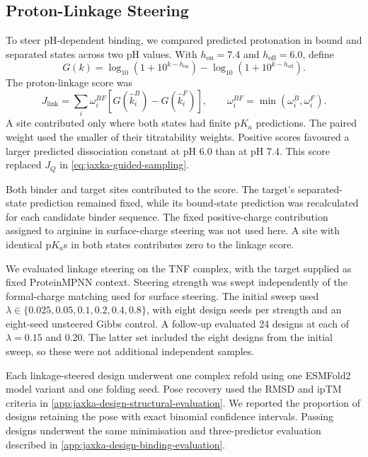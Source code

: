 \subsection{Proton-Linkage Steering}
\label{app:jaxka-proton-linkage}

To steer pH-dependent binding, we compared predicted protonation in bound and separated states across two pH values. With $h_{\mathrm{on}}=7.4$ and $h_{\mathrm{off}}=6.0$, define
\begin{equation}
    G(k)=
    \log_{10}\!\left(1+10^{k-h_{\mathrm{on}}}\right)
    -\log_{10}\!\left(1+10^{k-h_{\mathrm{off}}}\right).
    \label{eq:jaxka-linkage-interval}
\end{equation}
The proton-linkage score was
\begin{equation}
    J_{\mathrm{link}}
    =\sum_i\omega_i^{BF}
    \left[G(\hat{k}_i^B)-G(\hat{k}_i^F)\right],
    \qquad
    \omega_i^{BF}=\min(\omega_i^B,\omega_i^F).
    \label{eq:jaxka-linkage-score}
\end{equation}
A site contributed only where both states had finite $\mathrm{p}K_a$ predictions. The paired weight used the smaller of their titratability weights. Positive scores favoured a larger predicted dissociation constant at pH 6.0 than at pH 7.4. This score replaced $J_Q$ in \cref{eq:jaxka-guided-sampling}.

Both binder and target sites contributed to the score. The target's separated-state prediction remained fixed, while its bound-state prediction was recalculated for each candidate binder sequence. The fixed positive-charge contribution assigned to arginine in surface-charge steering was not used here. A site with identical $\mathrm{p}K_a$s in both states contributes zero to the linkage score.

We evaluated linkage steering on the TNF complex, with the target supplied as fixed ProteinMPNN context. Steering strength was swept independently of the formal-charge matching used for surface steering. The initial sweep used $\lambda\in\{0.025,0.05,0.1,0.2,0.4,0.8\}$, with eight design seeds per strength and an eight-seed unsteered Gibbs control. A follow-up evaluated 24 designs at each of $\lambda=0.15$ and $0.20$. The latter set included the eight designs from the initial sweep, so these were not additional independent samples.

Each linkage-steered design underwent one complex refold using one ESMFold2 model variant and one folding seed. Pose recovery used the RMSD and ipTM criteria in \cref{app:jaxka-design-structural-evaluation}. We reported the proportion of designs retaining the pose with exact binomial confidence intervals. Passing designs underwent the same minimisation and three-predictor evaluation described in \cref{app:jaxka-design-binding-evaluation}.

